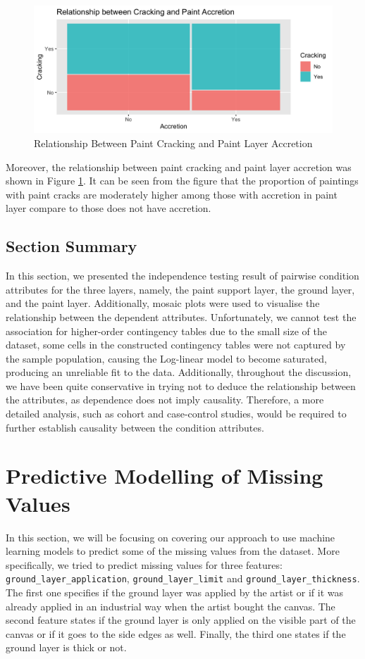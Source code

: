 \documentclass[11pt, oneside]{article}
\begin{document}
\begin{figure}[H]
    \centering
    \includegraphics[scale=0.17]{images/accretion_crack.png}
    \caption{Relationship Between Paint Cracking and Paint Layer Accretion}
    \label{accretion_crack}
\end{figure}

\noindent Moreover, the relationship between paint cracking and paint layer accretion was shown in Figure \ref{accretion_crack}. It can be seen from the figure that the proportion of paintings with paint cracks are moderately higher among those with accretion in paint layer compare to those does not have accretion.

\subsection{Section Summary}
In this section, we presented the independence testing result of pairwise condition attributes for the three layers, namely, the paint support layer, the ground layer, and the paint layer. Additionally, mosaic plots were used to visualise the relationship between the dependent attributes. Unfortunately, we cannot test the association for higher-order contingency tables due to the small size of the dataset, some cells in the constructed contingency tables were not captured by the sample population, causing the Log-linear model to become saturated, producing an unreliable fit to the data. Additionally, throughout the discussion, we have been quite conservative in trying not to deduce the relationship between the attributes, as dependence does not imply causality. Therefore, a more detailed analysis, such as cohort and case-control studies, would be required to further establish causality between the condition attributes.

\section{Predictive Modelling of Missing Values}
In this section, we will be focusing on covering our approach to use machine learning models to predict some of the missing values from the dataset. More specifically, we tried to predict missing values for three features: \texttt{ground\_layer\_application}, \texttt{ground\_layer\_limit} and \texttt{ground\_layer\_thickness}. The first one specifies if the ground layer was applied by the artist or if it was already applied in an industrial way when the artist bought the canvas. The second feature states if the ground layer is only applied on the visible part of the canvas or if it goes to the side edges as well. Finally, the third one states if the ground layer is thick or not.
\end{document}
